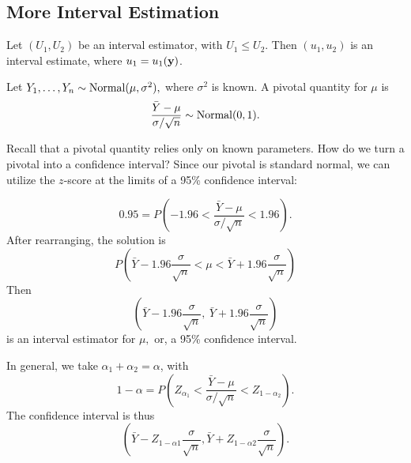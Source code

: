 
\subsection{More Interval Estimation}

\begin{definition}
Let $(U_1,U_2)$ be an interval estimator, with $U_1\leq U_2$. Then $(u_1,u_2)$ is an interval estimate, where $u_1=u_1(\mathbf y)$.
\end{definition}

\begin{eg}
Let $Y_1,\ldots,Y_n\sim \operatorname*{Normal}(\mu,\sigma^2),$ where $\sigma^2$ is known. A pivotal quantity for $\mu$ is
$$
\frac{\bar Y-\mu}{\sigma/\sqrt n}\sim\operatorname*{Normal}(0,1).
$$


Recall that a pivotal quantity relies only on known parameters. How do we turn a pivotal into a confidence interval? Since our pivotal is standard normal, we can utilize the $z$-score at the limits of a 95\% confidence interval:

$$
0.95=P\left(-1.96<\frac{\bar Y-\mu}{\sigma/\sqrt n}<1.96\right).
$$
After rearranging, the solution is
$$
P\left(\bar Y-1.96 \frac{\sigma}{\sqrt n}<\mu<\bar Y+1.96 \frac{\sigma}{\sqrt n}\right)
$$
Then 
$$
\left(\bar Y-1.96 \frac{\sigma}{\sqrt n}, \ \bar Y+1.96 \frac{\sigma}{\sqrt n}\right)
$$
is an interval estimator for $\mu,$ or, a 95\% confidence interval.
\end{eg}

In general, we take $\alpha_1+\alpha_2=\alpha$, with
$$
1-\alpha=P\left(Z_{\alpha_1}<\frac{\bar Y-\mu}{\sigma/\sqrt n}<Z_{1-\alpha_2}\right).
$$
The confidence interval is thus $$\left(\bar Y-Z_{1-\alpha 1}\frac{\sigma}{\sqrt n},\bar Y+Z_{1-\alpha 2}\frac{\sigma}{\sqrt n}\right).$$


